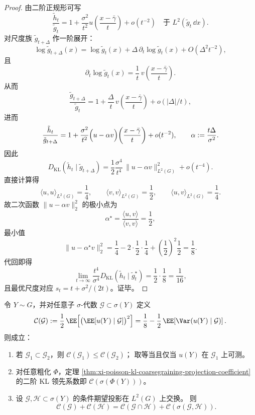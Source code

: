 \begin{proof}
由二阶正规形可写
\[
\frac{\tilde h_t}{\tilde g_t}
=1+\frac{\sigma^2}{t^2}u\!\left(\frac{x-\bar\gamma}{t}\right)+o(t^{-2})
\quad\text{于 }L^2(\tilde g_t\,\dd x).
\]
对尺度族 \(\tilde g_{t+\Delta}\) 作一阶展开：
\[
\log \tilde g_{t+\Delta}(x)
=\log \tilde g_t(x)+\Delta\,\partial_t\log\tilde g_t(x)+O(\Delta^2t^{-2}),
\]
且
\[
\partial_t\log\tilde g_t(x)
=\frac{1}{t}\,v\!\left(\frac{x-\bar\gamma}{t}\right).
\]
从而
\[
\frac{\tilde g_{t+\Delta}}{\tilde g_t}
=1+\frac{\Delta}{t}\,v\!\left(\frac{x-\bar\gamma}{t}\right)+o(|\Delta|/t),
\]
进而
\[
\frac{\tilde h_t}{\tilde g_{t+\Delta}}
=1+\frac{\sigma^2}{t^2}
\Bigl(u-\alpha v\Bigr)\!\left(\frac{x-\bar\gamma}{t}\right)
+o(t^{-2}),
\qquad
\alpha:=\frac{t\Delta}{\sigma^2}.
\]
因此
\[
D_{\mathrm{KL}}(\tilde h_t\mid \tilde g_{t+\Delta})
=\frac12\frac{\sigma^4}{t^4}\,\|u-\alpha v\|_{L^2(G)}^2+o(t^{-4}).
\]
直接计算得
\[
\langle u,u\rangle_{L^2(G)}=\frac14,\qquad
\langle v,v\rangle_{L^2(G)}=\frac12,\qquad
\langle u,v\rangle_{L^2(G)}=\frac14.
\]
故二次函数 \(\|u-\alpha v\|_2^2\) 的极小点为
\[
\alpha^\star=\frac{\langle u,v\rangle}{\langle v,v\rangle}=\frac12,
\]
最小值
\[
\|u-\alpha^\star v\|_2^2
=\frac14-2\cdot\frac12\cdot\frac14+\left(\frac12\right)^2\frac12
=\frac18.
\]
代回即得
\[
\lim_{t\to\infty}\frac{t^4}{\sigma^4}D_{\mathrm{KL}}(\tilde h_t\mid \tilde g_t^\star)
=\frac12\cdot\frac18=\frac{1}{16},
\]
且最优尺度对应 \(s_t=t+\sigma^2/(2t)\)。证毕。
\end{proof}

\begin{theorem}\label{thm:xi-poisson-second-order-petz-commuting-square}
令 \(Y\sim G\)，并对任意子 \(\sigma\)-代数 \(\mathcal G\subset \sigma(Y)\) 定义
\[
\mathcal C(\mathcal G)
:=\frac12\,\EE\!\left[\bigl(\EE[u(Y)\mid \mathcal G]\bigr)^2\right]
=\frac18-\frac12\,\EE\!\left[\Var(u(Y)\mid\mathcal G)\right].
\]
则成立：
\begin{enumerate}
  \item 若 \(\mathcal G_1\subset\mathcal G_2\)，则 \(\mathcal C(\mathcal G_1)\le \mathcal C(\mathcal G_2)\)；
  取等当且仅当 \(u(Y)\) 在 \(\mathcal G_1\) 上可测。
  \item 对任意粗化 \(\Phi\)，定理
  \ref{thm:xi-poisson-kl-coarsegraining-projection-coefficient} 的二阶 KL 领先系数即
  \(
  \mathcal C(\sigma(\Phi(Y)))
  \)。
  \item 设 \(\mathcal G,\mathcal H\subset \sigma(Y)\) 的条件期望投影在 \(L^2(G)\) 上交换。
  则
  \begin{equation}\label{eq:xi-poisson-commuting-square-pythagoras}
  \boxed{
  \mathcal C(\mathcal G)+\mathcal C(\mathcal H)
  =\mathcal C(\mathcal G\cap\mathcal H)+\mathcal C(\sigma(\mathcal G,\mathcal H))
  }.
  \end{equation}
\end{enumerate}
\end{theorem}

